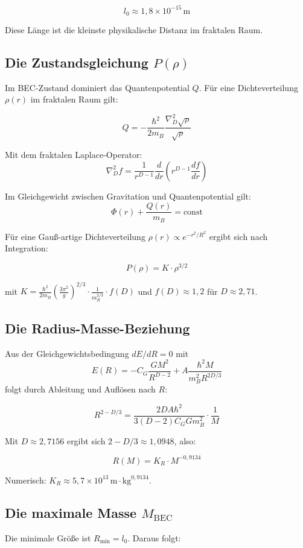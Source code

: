 \documentclass[12pt,a4paper]{article}
\begin{document}
\[
l_0 \approx 1{,}8 \times 10^{-15}\,\text{m}
\]

Diese Länge ist die kleinste physikalische Distanz im fraktalen Raum.

\subsection{Die Zustandsgleichung $P(\rho)$}

Im BEC-Zustand dominiert das Quantenpotential $Q$. Für eine Dichteverteilung $\rho(r)$ im fraktalen Raum gilt:

\[
Q = -\frac{\hbar^2}{2m_B} \frac{\nabla_D^2 \sqrt{\rho}}{\sqrt{\rho}}
\]

Mit dem fraktalen Laplace-Operator:
\[
\nabla_D^2 f = \frac{1}{r^{D-1}} \frac{d}{dr} \left( r^{D-1} \frac{df}{dr} \right)
\]

Im Gleichgewicht zwischen Gravitation und Quantenpotential gilt:
\[
\Phi(r) + \frac{Q(r)}{m_B} = \text{const}
\]

Für eine Gauß-artige Dichteverteilung $\rho(r) \propto e^{-r^2/R^2}$ ergibt sich nach Integration:

\[
P(\rho) = K \cdot \rho^{3/2}
\]

mit $K = \frac{\hbar^2}{2m_B} \left( \frac{3\pi^2}{g} \right)^{2/3} \cdot \frac{1}{m_B^{2/3}} \cdot f(D)$ und $f(D) \approx 1{,}2$ für $D \approx 2{,}71$.

\subsection{Die Radius-Masse-Beziehung}

Aus der Gleichgewichtsbedingung $dE/dR = 0$ mit
\[
E(R) = -C_G \frac{GM^2}{R^{D-2}} + A \frac{\hbar^2 M}{m_B^2 R^{2D/3}}
\]
folgt durch Ableitung und Auflösen nach $R$:

\[
R^{2 - D/3} = \frac{2D A \hbar^2}{3(D-2) C_G G m_B^2} \cdot \frac{1}{M}
\]

Mit $D \approx 2{,}7156$ ergibt sich $2 - D/3 \approx 1{,}0948$, also:

\[
R(M) = K_R \cdot M^{-0{,}9134}
\]

Numerisch: $K_R \approx 5{,}7 \times 10^{13} \, \text{m} \cdot \text{kg}^{0{,}9134}$.

\subsection{Die maximale Masse $M_{\text{BEC}}$}

Die minimale Größe ist $R_{\min} = l_0$. Daraus folgt:
\end{document}
